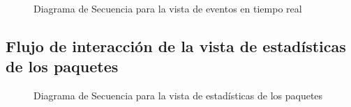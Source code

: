 \begin{figure}[H]
\caption{Diagrama de Secuencia para la vista de eventos en tiempo real}
\end{figure}

\subsection{Flujo de interacción de la vista de estadísticas de los paquetes}

\begin{figure}[H]
\caption{Diagrama de Secuencia para la vista de estadísticas de los paquetes}
\end{figure}

